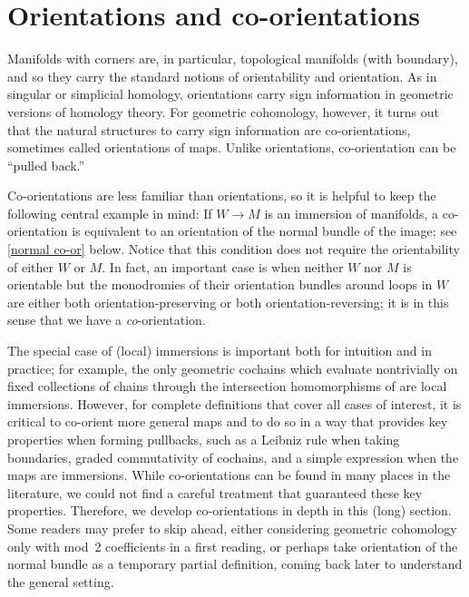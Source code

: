 
\section{Orientations and co-orientations}\label{S: orientations and co-orientations}

Manifolds with corners are, in particular, topological manifolds (with boundary), and so they carry the standard notions of orientability and orientation.
As in singular or simplicial homology, orientations carry sign information in geometric versions of homology theory.
For geometric cohomology, however, it turns out that the natural structures to carry sign information are co-orientations, sometimes called orientations of maps.
Unlike orientations, co-orientation can be ``pulled back.''

Co-orientations are less familiar than orientations, so it is helpful to keep the following central example in mind: If $W \to M$ is an immersion of manifolds, a co-orientation is equivalent to an orientation of the normal bundle of the image; see \cref{normal co-or} below.
Notice that this condition does not require the orientability of either $W$ or $M$.
In fact, an important case is when neither $W$ nor $M$ is orientable but the monodromies of their orientation bundles around loops in $W$ are either both orientation-preserving or both orientation-reversing; it is in this sense that we have a \textit{co}-orientation.

The special case of (local) immersions is important both for intuition and in practice; for example, the only geometric cochains which evaluate nontrivially on fixed collections of chains through the intersection homomorphisms of \cite{FMS-flows} are local immersions.
However, for complete definitions that cover all cases of interest, it is critical to co-orient more general maps and to do so in a way that provides key properties when forming pullbacks, such as a Leibniz rule when taking boundaries, graded commutativity of cochains, and a simple expression when the maps are immersions.
While co-orientations can be found in many places in the literature, we could not find a careful treatment that guaranteed these key properties.
Therefore, we develop co-orientations in depth in this (long) section.
Some readers may prefer to skip ahead, either considering geometric cohomology only with mod~2 coefficients in a first reading, or perhaps take orientation of the normal bundle as a temporary partial definition, coming back later to understand the general setting.

